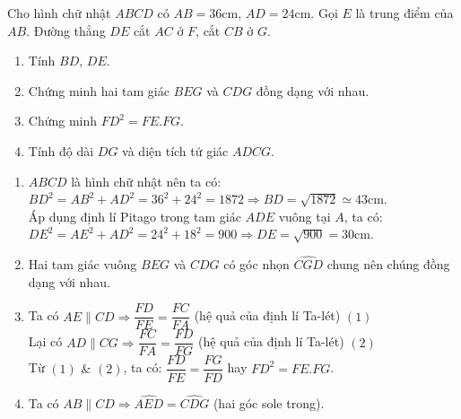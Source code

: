 \begin{ex}%
   Cho hình chữ nhật $ABCD$ có $AB = 36$cm, $AD = 24$cm. Gọi $E$ là trung điểm của $AB$. Đường thẳng $DE$ cắt $AC$ ở $F$, cắt $CB$ ở $G$.
   \begin{enumerate}
   \item Tính $BD$, $DE$.
   \item Chứng minh hai tam giác $BEG$ và $CDG$ đồng dạng với nhau.
   \item Chứng minh $FD^2 = FE.FG$.
   \item Tính độ dài $DG$ và diện tích tứ giác $ADCG$.
   \end{enumerate}
\loigiai
    {
    \begin{center}
    \end{center}
    \begin{enumerate}
    \item $ABCD$ là hình chữ nhật nên ta có:\\
    		$BD^2 = AB^2 + AD^2 = 36^2 + 24^2 = 1872 \Rightarrow BD = \sqrt{1872} \simeq 43$cm.\\
    		Áp dụng định lí Pitago trong tam giác $ADE$ vuông tại $A$, ta có:\\
    		 $DE^2 = AE^2 + AD^2 = 24^2 + 18^2 = 900 \Rightarrow DE = \sqrt{900} = 30$cm.
    \item Hai tam giác vuông $BEG$ và $CDG$ có góc nhọn $\widehat{CGD}$ chung nên chúng đồng dạng với nhau.
    \item Ta có $AE \parallel CD \Rightarrow \dfrac{FD}{FE} = \dfrac{FC}{FA}$ (hệ quả của định lí Ta-lét) \hfill $(1)$\\
    		Lại có $AD \parallel CG \Rightarrow \dfrac{FC}{FA} = \dfrac{FD}{FG}$ (hệ quả của định lí Ta-lét) \hfill $(2)$\\
    		Từ $(1)$ $\&$ $(2)$, ta có: $\dfrac{FD}{FE} = \dfrac{FG}{FD}$ hay $FD^2 = FE.FG$.
    \item Ta có $AB \parallel CD \Rightarrow \widehat{AED} = \widehat{CDG}$ (hai góc sole trong).\\

\end{enumerate}}
\end{ex}
